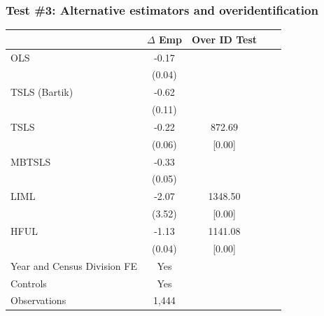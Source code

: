 \documentclass[notes,11pt, aspectratio=169]{beamer}
\begin{document}

\begin{frame}[fragile,label=sh_results]
\frametitle{Test \#3: Alternative estimators and overidentification}


\small
\begin{table}[htbp]
\label{table:olsiv_bartik}
\begin{center}
  \begin{tabular}{l*{4}{c}}
\toprule
  & \multicolumn{1}{c}{$\Delta$ Emp} & Over ID Test\\
\midrule
OLS  & -0.17 &  \\
    & \textcolor{gray!75}{(0.04)}&         & \\
TSLS (Bartik)  & -0.62 &  \\
              &  \textcolor{gray!75}{(0.11) }&         & \\
TSLS           & -0.22 & 872.69\\
              &  \textcolor{gray!75}{(0.06)}        & [0.00]\\
MBTSLS  & -0.33 & \\
    &  \textcolor{gray!75}{(0.05)}&         & \\
LIML  & -2.07 & 1348.50\\
    &  \textcolor{gray!75}{(3.52)}&          [0.00]\\
HFUL & -1.13 &  1141.08\\
    &  \textcolor{gray!75}{(0.04)}&         [0.00]\\
\midrule
Year and Census Division FE&            Yes\\
Controls        &           Yes\\
Observations    &      1,444\\
\bottomrule
\end{tabular}
\end{center}
\end{table}



\end{frame}
\end{document}
